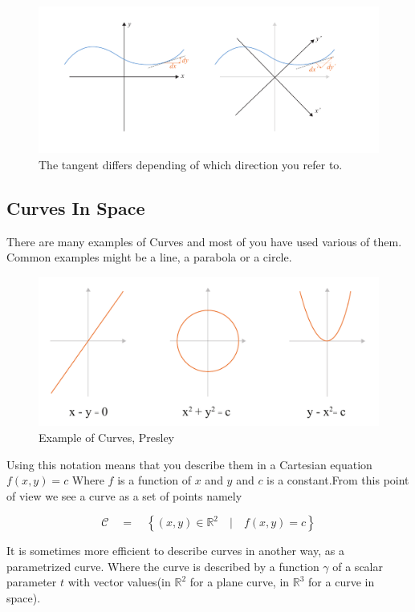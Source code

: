 \begin{figure}[H]
\centering
\includegraphics[width=0.9\linewidth ]{figure/Theory/intrisic_extrinsic1.pdf}
\caption{The tangent differs depending of which direction you refer to. }
\end{figure}

\subsection{Curves In Space}
There are many examples of Curves and most of you have used various of them. Common examples might be a line, a parabola or a circle. 


\begin{figure}[H]
\centering
\includegraphics[width=0.9\linewidth ]{figure/Theory/CurveExample.pdf}  \caption{Example of Curves, Presley }
\end{figure}

Using this notation means that you describe them in a Cartesian equation $f(x,y) = c$
Where $f$ is a function of $x$ and $y$ and $c$ is a constant.From this point of view we see a curve as a set of points namely

$$ \mathcal{C}\quad =\quad \left\{ (x,y) \in \mathbb{R}^2\quad |\quad f(x,y) = c \right\} $$


It is sometimes more efficient to describe curves in another way, as a parametrized curve. Where the curve is described by a function $\gamma$ of a scalar parameter $t$ with vector values(in $\mathbb{R}^2$ for a plane curve, in $\mathbb{R}^3$ for a curve in space). 

